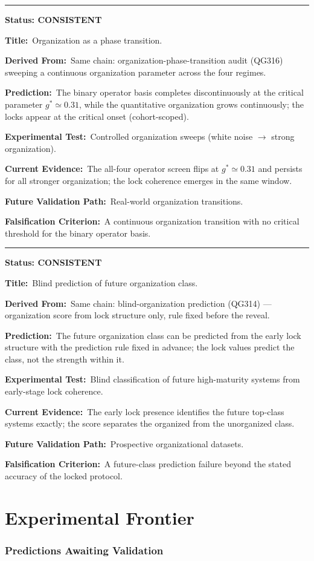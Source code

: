 \documentclass[11pt,a4paper]{article}
\newcommand{\predstart}[2]{%
  \par\medskip\noindent\hrule\par\smallskip
  \noindent{\large\bfseries #1}\hfill{\bfseries Status: #2}\par\smallskip
}
\newcommand{\pfield}[2]{%
  \noindent\textbf{#1:}~#2\par\smallskip
}
\begin{document}
\predstart{AT-P037}{CONSISTENT}
\pfield{Title}{Organization as a phase transition.}
\pfield{Derived From}{Same chain: organization-phase-transition audit (QG316) sweeping a
continuous organization parameter across the four regimes.}
\pfield{Prediction}{The binary operator basis completes discontinuously at the critical
parameter $g^\ast \simeq 0.31$, while the quantitative organization grows continuously;
the locks appear at the critical onset (cohort-scoped).}
\pfield{Experimental Test}{Controlled organization sweeps (white noise $\to$ strong
organization).}
\pfield{Current Evidence}{The all-four operator screen flips at $g^\ast \simeq 0.31$ and
persists for all stronger organization; the lock coherence emerges in the same window.}
\pfield{Future Validation Path}{Real-world organization transitions.}
\pfield{Falsification Criterion}{A continuous organization transition with no critical
threshold for the binary operator basis.}

\predstart{AT-P038}{CONSISTENT}
\pfield{Title}{Blind prediction of future organization class.}
\pfield{Derived From}{Same chain: blind-organization prediction (QG314) --- organization
score from lock structure only, rule fixed before the reveal.}
\pfield{Prediction}{The future organization class can be predicted from the early lock
structure with the prediction rule fixed in advance; the lock values predict the class, not
the strength within it.}
\pfield{Experimental Test}{Blind classification of future high-maturity systems from
early-stage lock coherence.}
\pfield{Current Evidence}{The early lock presence identifies the future top-class systems
exactly; the score separates the organized from the unorganized class.}
\pfield{Future Validation Path}{Prospective organizational datasets.}
\pfield{Falsification Criterion}{A future-class prediction failure beyond the stated
accuracy of the locked protocol.}

\part{Experimental Frontier}

\section{Predictions Awaiting Validation}
\label{sec:frontier}
\end{document}
